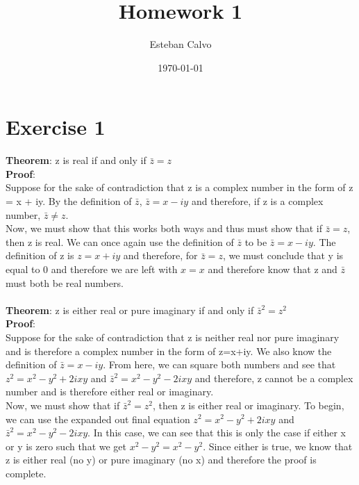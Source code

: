 \documentclass[notitlepage]{article}
\begin{document}
  
\title{Homework 1}
\author{Esteban Calvo}
\date{\isodate\today}

\maketitle

\newpage


 \section*{Exercise 1}
    \textbf{Theorem}: z is real if and only if $\bar{z} = z$ \\
   \textbf{Proof}: \\
         
        Suppose for the sake of contradiction that z is a complex number in the form of 
        z = x + iy. By the definition of $\bar{z}$, $\bar{z} = x- iy$ and therefore, if z
        is a complex number, $\bar{z} \neq z$.\\

        Now, we must show that this works both ways and thus must show that if $\bar{z} = z$,
        then z is real. We can once again use the definition
        of $\bar{z}$ to be $\bar{z} = x-iy$. The definition of z is $z = x+iy$ and therefore, for
        $\bar{z} = z$, we must conclude that y is equal to 0 and therefore we are left with 
        $x = x$ and therefore know that z and $\bar{z}$ must both be real numbers.\\~\\
    \textbf{Theorem}: z is either real or pure imaginary if and only if $\bar{z}^2 = z^2$ \\
    \textbf{Proof}: \\

        Suppose for the sake of contradiction that z is neither real nor pure imaginary and is therefore
        a complex number in the form of z=x+iy. We also know the definition of $\bar{z}=x-iy$. From here,
        we can square both numbers and see that $z^2 = x^2-y^2+2ixy$ and $\bar{z}^2=x^2-y^2-2ixy$ 
        and therefore, z cannot be a complex number and is therefore either real or imaginary. \\

        Now, we must show that if $\bar{z}^2 = z^2$, then z is either real or imaginary. To begin,
        we can use the expanded out final equation $z^2 = x^2-y^2+2ixy$ and $\bar{z}^2=x^2-y^2-2ixy$.
        In this case, we can see that this is only the case if either x or y is zero such that we get
        $x^2-y^2 = x^2-y^2$. Since either is true, we know that z is either real (no y) or pure imaginary
        (no x) and therefore the proof is complete. \\~\\
\end{document}
